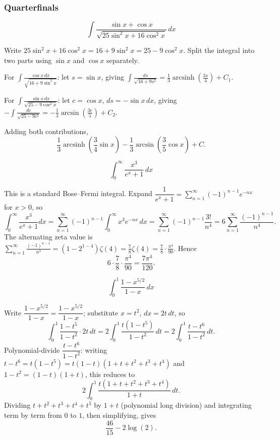 \subsubsection*{Quarterfinals}

\begin{questions}

\question
\[
\int \frac{\sin x+\cos x}{\sqrt{25\sin^{2}x+16\cos^{2}x}}\,dx
\]
\begin{solution}
Write $25\sin^2x+16\cos^2x=16+9\sin^2x=25-9\cos^2x$. Split the integral into two parts using $\sin x$ and $\cos x$ separately.

For $\displaystyle\int\frac{\cos x\,dx}{\sqrt{16+9\sin^2x}}$: let $s=\sin x$, giving $\displaystyle\int\frac{ds}{\sqrt{16+9s^2}}=\frac13\operatorname{arcsinh}\!\left(\frac{3s}{4}\right)+C_1$.

For $\displaystyle\int\frac{\sin x\,dx}{\sqrt{25-9\cos^2x}}$: let $c=\cos x$, $ds=-\sin x\,dx$, giving $\displaystyle-\int\frac{dc}{\sqrt{25-9c^2}}=-\frac13\arcsin\!\left(\frac{3c}{5}\right)+C_2$.

Adding both contributions,
\[
\frac13\operatorname{arcsinh}\!\left(\frac34\sin x\right)-\frac13\arcsin\!\left(\frac35\cos x\right)+C.
\]
\end{solution}

\question
\[
\int_0^{\infty} \frac{x^{3}}{e^{x}+1}\,dx
\]
\begin{solution}
This is a standard Bose–Fermi integral. Expand $\dfrac{1}{e^x+1}=\displaystyle\sum_{n=1}^{\infty}(-1)^{n-1}e^{-nx}$ for $x>0$, so
\[
\int_0^\infty \frac{x^3}{e^x+1}dx=\sum_{n=1}^\infty(-1)^{n-1}\int_0^\infty x^3e^{-nx}\,dx=\sum_{n=1}^\infty(-1)^{n-1}\frac{3!}{n^4}=6\sum_{n=1}^\infty\frac{(-1)^{n-1}}{n^4}.
\]
The alternating zeta value is $\displaystyle\sum_{n=1}^\infty\frac{(-1)^{n-1}}{n^4}=\left(1-2^{1-4}\right)\zeta(4)=\frac{7}{8}\zeta(4)=\frac{7}{8}\cdot\frac{\pi^4}{90}$.
Hence
\[
6\cdot\frac{7}{8}\cdot\frac{\pi^4}{90}=\frac{7\pi^4}{120}.
\]
\end{solution}

\question
\[
\int_0^1 \frac{1-x^{5/2}}{1-x}\,dx
\]
\begin{solution}
Write $\dfrac{1-x^{5/2}}{1-x}=\dfrac{1-x^{5/2}}{1-x}$; substitute $x=t^2$, $dx=2t\,dt$, so
\[
\int_0^1 \frac{1-t^5}{1-t^2}\cdot 2t\,dt=2\int_0^1 \frac{t(1-t^5)}{1-t^2}\,dt=2\int_0^1 \frac{t-t^6}{1-t^2}\,dt.
\]
Polynomial-divide $\dfrac{t-t^6}{1-t^2}$: writing $t-t^6=t(1-t^5)=t(1-t)(1+t+t^2+t^3+t^4)$ and $1-t^2=(1-t)(1+t)$, this reduces to
\[
2\int_0^1 \frac{t(1+t+t^2+t^3+t^4)}{1+t}\,dt.
\]
Dividing $t+t^2+t^3+t^4+t^5$ by $1+t$ (polynomial long division) and integrating term by term from $0$ to $1$, then simplifying, gives
\[
\frac{46}{15}-2\log(2).
\]
\end{solution}


\end{questions}
